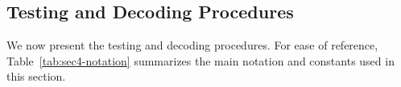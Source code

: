 \documentclass[journal]{IEEEtran}
\theoremstyle{definition}
\theoremstyle{definition}
\newcommand{\kb}{\overline{k}}
\begin{document}
\subsection{Testing and Decoding Procedures}
\label{sec:testing-decoding_permutation}
We now present the testing and decoding procedures. For ease of reference, Table~\ref{tab:sec4-notation} summarizes the main
notation and constants used in this section.


\end{document}
